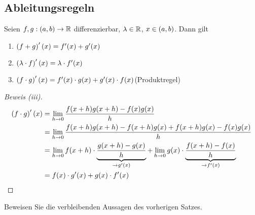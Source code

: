 \subsection{Ableitungsregeln}

\begin{satz} %
    \label{satz:ableitungsregeln}
    Seien $f, g: (a,b)\rightarrow{} \mathbb{R}$ differenzierbar, $\lambda\in\mathbb{R}$, $x\in\left(a,b\right)$. Dann gilt
    \begin{enumerate}[label=(\roman*)]
        \item $\pair{f+g}'\of{x} = f'(x)+g'(x)$
        \item $\pair{\lambda\cdot f}'\of{x} = \lambda\cdot f'(x)$
        \item $\pair{f\cdot g}'\of{x} = f'(x)\cdot g(x) + g'(x)\cdot f(x)$\quad\quad(Produktregel)
    \end{enumerate}
    \begin{proof}[Beweis (iii)]
        \begin{align*}
            \pair{f\cdot g}'\of{x} &= \lim_{h\fromto 0} \frac{f(x+h)g(x+h) - f(x)g(x)}{h}\\
            &= \lim_{h\fromto 0} \frac{f(x+h)g(x+h) - f(x+h)g(x) + f(x+h)g(x) - f(x)g(x)}{h}\\
            &= \lim_{h\fromto 0} f(x+h)\cdot \underbrace{\frac{g(x+h)-g(x)}{h}}_{\fromto g'(x)} + \lim_{h\fromto 0} g(x) \cdot \underbrace{\frac{f(x+h)-f(x)}{h}}_{\fromto f'(x)}\\
            &= f(x) \cdot g'(x) + g(x)\cdot f'(x)\qedhere
        \end{align*}
    \end{proof}
\end{satz}

\begin{uebung}
    Beweisen Sie die verbleibenden Aussagen des vorherigen Satzes.
\end{uebung}

